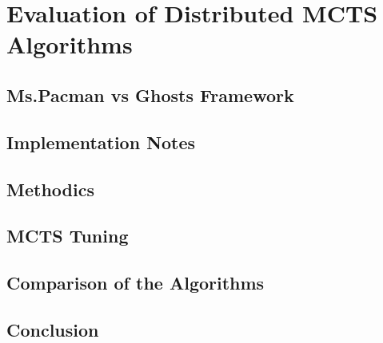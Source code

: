 \chapter{Evaluation of Distributed MCTS Algorithms}

\section{Ms.Pacman vs Ghosts Framework}

\section{Implementation Notes}

\section{Methodics}

\section{MCTS Tuning}

\section{Comparison of the Algorithms}

\section{Conclusion}
